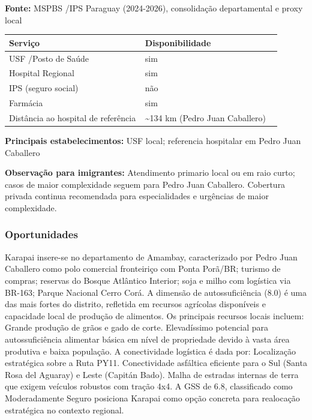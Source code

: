 \textbf{Fonte:} MSPBS /\allowbreak  IPS Paraguay (2024-2026), consolidação
departamental e proxy local

{\def\LTcaptype{none} %
\begin{longtable}{@{}>{\raggedright\arraybackslash}p{0.45\linewidth} >{\raggedright\arraybackslash}p{0.45\linewidth}@{}}
\toprule\noalign{}
Serviço & Disponibilidade \\
\midrule\noalign{}
\endhead
\bottomrule\noalign{}
\endlastfoot
USF /\allowbreak  Posto de Saúde & sim \\
Hospital Regional & sim \\
IPS (seguro social) & não \\
Farmácia & sim \\
Distância ao hospital de referência & \textasciitilde134 km (Pedro Juan
Caballero) \\
\end{longtable}
}

\textbf{Principais estabelecimentos:} USF local; referencia hospitalar
em Pedro Juan Caballero

\textbf{Observação para imigrantes:} Atendimento primario local ou em
raio curto; casos de maior complexidade seguem para Pedro Juan
Caballero. Cobertura privada continua recomendada para especialidades e
urgências de maior complexidade.
\newpage

\subsubsection*{Oportunidades}\label{oport-karapai-1305}
Karapai insere-se no departamento de Amambay, caracterizado por Pedro Juan Caballero como polo comercial fronteiriço com Ponta Porã/BR; turismo de compras; reservas do Bosque Atlântico Interior; soja e milho com logística via BR-163; Parque Nacional Cerro Corá. A dimensão de autossuficiência (8.0) é uma das mais fortes do distrito, refletida em recursos agrícolas disponíveis e capacidade local de produção de alimentos. Os principais recursos locais incluem: Grande produção de grãos e gado de corte. Elevadíssimo potencial para autossuficiência alimentar básica em nível de propriedade devido à vasta área produtiva e baixa população. A conectividade logística é dada por: Localização estratégica sobre a Ruta PY11. Conectividade asfáltica eficiente para o Sul (Santa Rosa del Aguaray) e Leste (Capitán Bado). Malha de estradas internas de terra que exigem veículos robustos com tração 4x4. A GSS de 6.8, classificado como Moderadamente Seguro posiciona Karapai como opção concreta para realocação estratégica no contexto regional.

